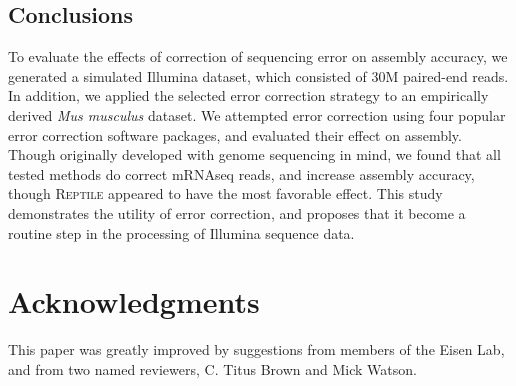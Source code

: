 \documentclass[11pt]{article}
\begin{document}
\subsection*{Conclusions}
To evaluate the effects of correction of sequencing error on assembly accuracy, we generated a simulated Illumina dataset, which consisted of 30M paired-end reads.  In addition, we applied the selected error correction strategy to an empirically derived \textit{Mus musculus} dataset. We attempted error correction using four popular error correction software packages, and evaluated their effect on assembly.  Though originally developed with genome sequencing in mind, we found that all tested methods do correct mRNAseq reads, and increase assembly accuracy, though \textsc{Reptile} appeared to have the most favorable effect. This study demonstrates the utility of error correction, and proposes that it become a routine step in the processing of Illumina sequence data. \\



\section*{Acknowledgments}
This paper was greatly improved by suggestions from members of the Eisen Lab, and from two named reviewers, C. Titus Brown and Mick Watson.  

\singlespacing


\end{document}
